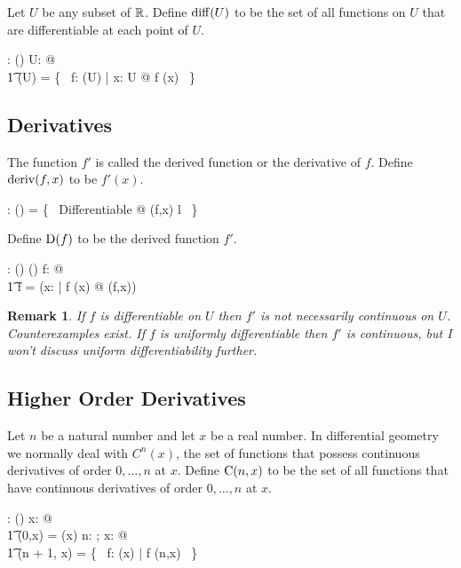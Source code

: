 \documentclass[11pt, oneside]{article}
\newtheorem*{remark}{Remark}
\begin{document}
Let $U$ be any subset of $\mathbb{R}$. 
Define $\operatorname{diff}(U)$ to be the set of all functions on $U$
that are differentiable at each point of $U$.
\begin{axdef}
	\diffPR: \power \R \fun \power(\R \pfun \R)
\where
	\forall U: \power \R @ \\
	\t1	\diffPR(U) = \{~ f: \CzeroPR(U) | \forall x: U @ f \in \diffR(x) ~\}
\end{axdef}

\subsection{Derivatives}

The function $f'$ is called the derived function or the derivative of $f$.
Define $\operatorname{deriv}(f,x)$ to be $f'(x)$.
\begin{axdef}
	\derivFR: (\R \pfun \R) \cross \R \pfun \R
\where
	\derivFR = \{~ Differentiable @ (f,x) \mapsto l ~\}
\end{axdef}

Define $\operatorname{D}(f)$ to be the derived function $f'$.
\begin{axdef}
	\derivF: (\R \pfun \R) \fun (\R \pfun \R)
\where
	\forall f: \R \pfun \R @ \\
		\t1	\derivF f = (\lambda x: \R | f \in \diffR(x) @ \derivFR(f,x)) 
\end{axdef}

\begin{remark}
If $f$ is differentiable on $U$ then $f'$ is not necessarily continuous on $U$.
Counterexamples exist.
If $f$ is uniformly differentiable then $f'$ is continuous, but I won't discuss uniform differentiability further.
\end{remark}

\subsection{Higher Order Derivatives}

Let $n$ be a natural number and let $x$ be a real number.
In differential geometry we normally deal with $C^n(x)$, the set of functions
that possess continuous derivatives of order $0, \ldots, n$ at $x$.
Define $\operatorname{C}(n,x)$ to be the set of all functions that have continuous derivatives of order $0, \ldots, n$ at $x$.
\begin{axdef}
	\CnR: \nat \cross \R \fun \power(\R \pfun \R)
\where
	\forall x: \R @ \\
	\t1	\CnR(0,x) = \CzeroR(x)
\also
	\forall n: \nat; x: \R @ \\
	\t1	\CnR(n + 1, x) = \{~ f: \CzeroR(x) | \derivF f \in \CnR(n,x) ~\}
\end{axdef}
\end{document}
